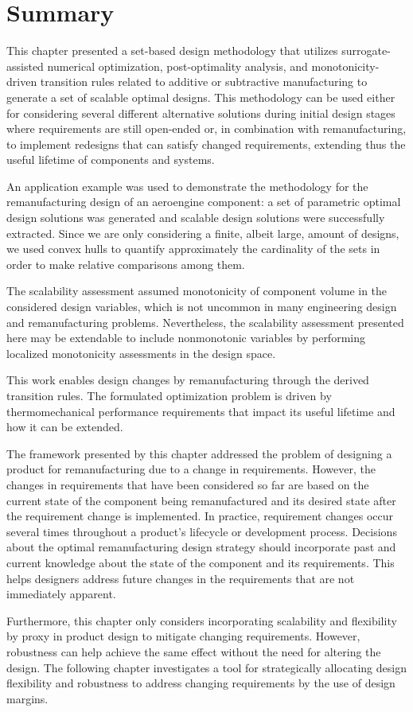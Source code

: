 \section{Summary}
\label{sec:scalableSBDsummary}

This chapter presented a set-based design methodology that utilizes surrogate-assisted numerical optimization, post-optimality analysis, and monotonicity-driven transition rules related to additive or subtractive manufacturing to generate a set of scalable optimal designs. This methodology can be used either for considering several different alternative solutions during initial design stages where requirements are still open-ended or, in combination with remanufacturing, to implement redesigns that can satisfy changed requirements, extending thus the useful lifetime of components and systems.

An application example was used to demonstrate the methodology for the remanufacturing design of an aeroengine component: a set of parametric optimal design solutions was generated and scalable design solutions were successfully extracted. Since we are only considering a finite, albeit large, amount of designs, we used convex hulls to quantify approximately the cardinality of the sets in order to make relative comparisons among them. 

The scalability assessment assumed monotonicity of component volume in the considered design variables, which is not uncommon in many engineering design and remanufacturing problems. Nevertheless, the scalability assessment presented here may be extendable to include nonmonotonic variables by performing localized monotonicity assessments in the design space.

This work enables design changes by remanufacturing through the derived transition rules. The formulated optimization problem is driven by thermomechanical performance requirements that impact its useful lifetime and how it can be extended.

The framework presented by this chapter addressed the problem of designing a product for remanufacturing due to a change in requirements. However, the changes in requirements that have been considered so far are based on the current state of the component being remanufactured and its desired state after the requirement change is implemented. In practice, requirement changes occur several times throughout a product's lifecycle or development process. Decisions about the optimal remanufacturing design strategy should incorporate past and current knowledge about the state of the component and its requirements. This helps designers address future changes in the requirements that are not immediately apparent.

Furthermore, this chapter only considers incorporating scalability and flexibility by proxy in product design to mitigate changing requirements. However, robustness can help achieve the same effect without the need for altering the design. The following chapter investigates a tool for strategically allocating design flexibility and robustness to address changing requirements by the use of design margins.
